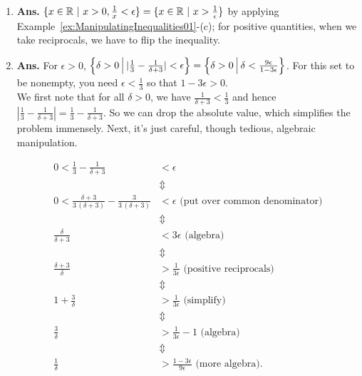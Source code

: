 \begin{enumerate}
\renewcommand{\labelenumi}{(\alph{enumi})}
\setlength{\itemsep}{.2cm}


\item \textbf{Ans.} $\{ x \in \mathbb R~|~ x>0,  \frac{1}{x} < \epsilon \} = \{ x \in \mathbb R~|~   x > \frac{1}{\epsilon} \}$ by applying Example~\ref{ex:ManipulatingInequalities01}-(c); for positive quantities, when we take reciprocals, we have to flip the inequality.

\item \textbf{Ans.} For $\epsilon > 0$, $\left\{ \delta>0~\vrule height .4cm depth 0.2cm ~ |\frac{1}{3} - \frac{1}{\delta + 3 }|  < \epsilon\right\} = \left\{ \delta>0~\vrule height .4cm depth 0.2cm ~ \delta < \frac{9 \epsilon}{1 - 3 \epsilon} \right\} $. For this set to be nonempty, you need $\epsilon < \frac{1}{3}$ so that $1 - 3 \epsilon > 0$. \\

We first note that for all $\delta >0$, we have $ \frac{1}{\delta + 3 } < \frac{1}{3 }$ and hence $|\frac{1}{3} - \frac{1}{\delta + 3 }| =\frac{1}{3} - \frac{1}{\delta + 3 } $. So we can drop the absolute value, which simplifies the problem immensely. Next, it's just careful, though tedious, algebraic manipulation.

\begin{align*}
    0 < \frac{1}{3} - \frac{1}{\delta + 3 } & < \epsilon \\
    & \Updownarrow \\
      0 < \frac{\delta + 3}{3\, (\delta + 3)} - \frac{3}{3\, (\delta + 3) } & < \epsilon \text{ (put over common denominator)}\\
    & \Updownarrow \\
    \frac{\delta}{\delta + 3 } & < 3 \epsilon \text{ (algebra)} \\
         & \Updownarrow \\
     \frac{\delta + 3}{\delta } & > \frac{1}{ 3 \epsilon} \text{ (positive reciprocals)} \\
            & \Updownarrow \\
    1  + \frac{3}{\delta } & > \frac{1}{ 3 \epsilon} \text{ (simplify)}\\
                & \Updownarrow \\
      \frac{3}{\delta } & > \frac{1}{ 3 \epsilon} - 1  \text{ (algebra)}\\
                      & \Updownarrow \\
      \frac{1}{\delta } & > \frac{1 - 3 \epsilon}{ 9 \epsilon}  \text{ (more algebra)}.\\
\end{align*}


\end{enumerate}
